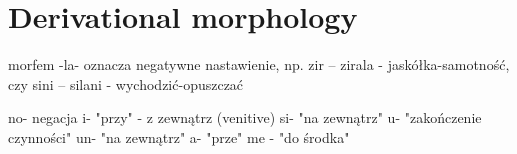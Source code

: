 \chapter{Derivational morphology}
\label{ch:derivational}

morfem -la- oznacza negatywne nastawienie, np. zir -- zirala -
jaskółka-samotność, czy sini -- silani - wychodzić-opuszczać

no- negacja
i- "przy" - z zewnątrz (venitive)
si- "na zewnątrz"
u- "zakończenie czynności"
un- "na zewnątrz"
a- "prze"
me - "do środka"
